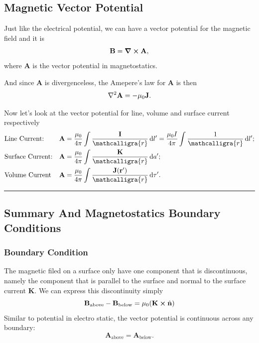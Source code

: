 \documentclass[12pt,english]{article}
\newcommand{\dmr}[1]{\, \mathrm{d}#1} %
\numberwithin{equation}{subsection}
\newcommand{\curly}[1]{\ensuremath{\mathcalligra{#1}}}
\let\oldhat\hat
\renewcommand{\vec}[1]{\mathbf{#1}}
\renewcommand{\hat}[1]{\oldhat{\mathbf{#1}}}
\begin{document}
\subsection{Magnetic Vector Potential}
Just like the electrical potential, we can have a vector potential for the magnetic field and it is 
\begin{equation}
    \vec{B} = \curl \vec{A},
\end{equation}
where $\vec{A}$ is the vector potential in magnetostatics.

And since $\vec{A}$ is divergenceless, the Amepere's law for $\vec{A}$ is then 
\begin{equation}
    \laplacian\vec{A} = - \mu_0 \vec{J}.
\end{equation}

Now let's look at the vector potential for line, volume and surface current respectively
\begin{align}
    &\text{Line Current:} &&\vec{A} = \frac{\mu_0}{4 \pi} \int \frac{\vec{I}}{\curly{r}}\dmr{l'} = \frac{\mu_0 I }{4 \pi} \int \frac{1}{\curly{r}}\dmr{l'};\\
    &\text{Surface Current:} &&\vec{A} = \frac{\mu_0 }{4 \pi} \int \frac{\vec{K}}{\curly{r}}\dmr{a'};\\
    &\text{Volume Current} &&\vec{A} = \frac{\mu_0}{4 \pi}\int \frac{\vec{J}(\vec{r'})}{\curly{r}}\dmr{\tau'}.
\end{align}

\par\noindent\rule{\textwidth}{0.4pt}
\subsection{Summary And Magnetostatics Boundary Conditions}
\subsubsection{Boundary Condition}
The magnetic filed on a surface only have one component that is discontinuous, namely the component that is parallel to the surface and normal to the surface current $\vec{K}$. We can express this discontinuity simply
\begin{equation}
    \vec{B}_{\text{above}} - \vec{B}_{\text{below}} = \mu_0(\vec{K}\cross \hat{n})
\end{equation}
Similar to potential in electro static, the vector potential is continuous across any boundary:
\begin{equation}
    \vec{A}_{\text{above}} = \vec{A}_{\text{below}}.
\end{equation}
\end{document}
